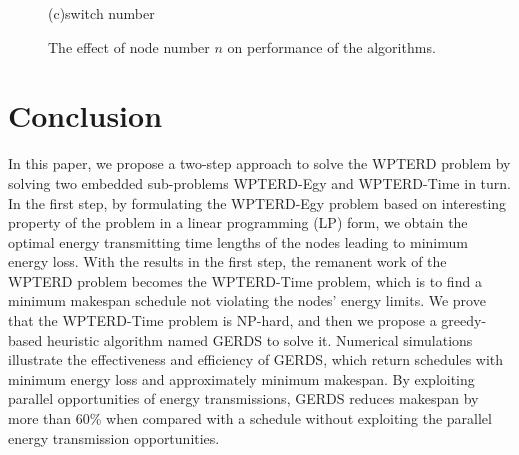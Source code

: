 \documentclass[journal,10pt]{IEEEtran}
\begin{document}
\begin{figure}[!htbp]
{\hspace{0.01\textwidth}%
\begin{minipage}[c]{0.30\textwidth}
\parbox{\linewidth}{\centering\small{(c)switch number}}
\end{minipage}
}
\caption{The effect of node number $n$ on performance of the algorithms.}
\label{fig_sim_n}
\end{figure}


\section{Conclusion}
\label{sec_conclusion}
In this paper, we propose a two-step approach to solve the WPTERD problem by solving two embedded sub-problems WPTERD-Egy and WPTERD-Time in turn. In the first step, by formulating the WPTERD-Egy problem based on interesting property of the problem in a linear programming (LP) form, we obtain the optimal energy transmitting time lengths of the nodes leading to minimum energy loss. With the results in the first step, the remanent work of the WPTERD problem becomes the WPTERD-Time problem, which is to find a minimum makespan schedule not violating the nodes' energy limits. We prove that the WPTERD-Time problem is NP-hard, and then we propose a greedy-based heuristic algorithm named GERDS to solve it. Numerical simulations illustrate the effectiveness and efficiency of GERDS, which return schedules with minimum energy loss and approximately minimum makespan. By exploiting parallel opportunities of energy transmissions, GERDS reduces makespan by more than 60\% when compared with a schedule without exploiting the parallel energy transmission opportunities.
\end{document}
